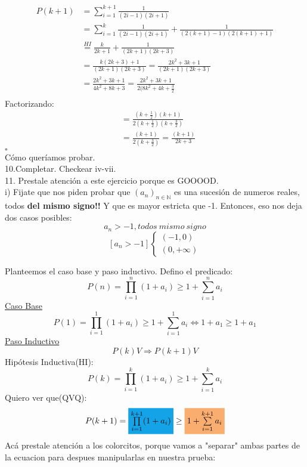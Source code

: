 \documentclass[a4paper,11pt]{article}
\begin{document}
\begin{equation}
\begin{split}
 P(k+1) & = \sum_{i=1}^{k+1} \frac{1}{(2i-1)(2i+1)}  \\
 & = \sum_{i=1}^{k} \frac{1}{(2i-1)(2i+1)} + \frac{1}{(2(k+1)-1)(2(k+1)+1)} \\
 & \stackrel{HI}{=} \frac{k}{2k+1} +  \frac{1}{(2k+1)(2k+3)} \\
 & = \frac{k(2k+3)+1}{(2k+1)(2k+3)} = \frac{2k^2+3k+1}{(2k+1)(2k+3)}\\
 & = \frac{2k^2+3k+1}{4k^2+8k+3} = \frac{2k^2+3k+1}{2(8k^2+4k+\frac{3}{2}} \\
\end{split}
\end{equation}
Factorizando:
\begin{equation}
\begin{split}
 & = \frac{(k+\frac{1}{2})(k+1)}{2(k+\frac{1}{2})(k+\frac{3}{2})} \\
 & = \frac{(k+1)}{2(k+\frac{3}{2})} = \frac{(k+1)}{2k+3}
\end{split}
\end{equation}
\hfill$\square $\\
Cómo queríamos probar.\\
10.Completar. Checkear iv-vii.\\
11. Prestale atención a este ejercicio porque es GOOOOD. \\
i) Fijate que nos piden probar que $(a_n)_{n\in\mathbb{N}}$ es una sucesión de numeros reales, todos \textbf{del mismo signo!!} Y que es mayor estricta que -1. Entonces, eso nos deja dos casos posibles:\\

\[a_n > -1, todos\:mismo\:signo 
\]
$$
[ a_n > -1 ]
\begin{cases}
(-1, 0) \\
(0, +\infty)
\end{cases}
$$

Planteemos el caso base y paso inductivo. Defino el predicado:\\
\[ P(n) = \prod_{i=1}^{n}(1+a_i) \geq 1 + \sum_{i=1}^{n} a_i \]
\underline{Caso Base}\\
\[ P(1) = \prod_{i=1}^{1}(1+a_i) \geq 1 + \sum_{i=1}^{1} a_i \Leftrightarrow 1 + a_1 \geq 1 + a_1 \]
\underline{Paso Inductivo}\\
\[P(k) V \Rightarrow P(k+1) V\]
Hipótesis Inductiva(HI):\[ P(k) = \prod_{i=1}^{k}(1+a_i) \geq 1 + \sum_{i=1}^{k} a_i \]
Quiero ver que(QVQ):\[P(k+1) = \colorbox{Cerulean}{$\prod\limits_{i=1}^{k+1}(1+a_i)$} \geq   \colorbox{Apricot}{$1 + \sum\limits_{i=1}^{k+1} a_i $}  \]
Acá prestale atención a los colorcitos, porque vamos a "separar" ambas partes de la ecuacion para despues manipularlas en nuestra prueba:\\
\end{document}
